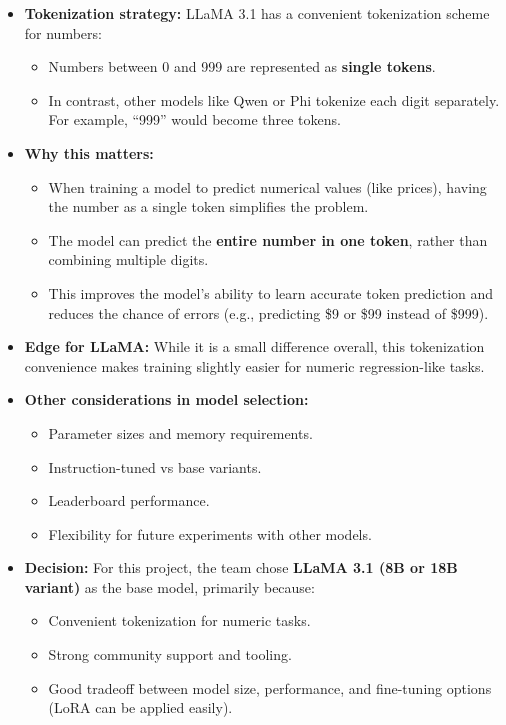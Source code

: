 \documentclass[a4paper, 12pt]{article}
\begin{document}
\begin{itemize}
    \item \textbf{Tokenization strategy:} LLaMA 3.1 has a convenient tokenization scheme for numbers:
    \begin{itemize}
        \item Numbers between 0 and 999 are represented as \textbf{single tokens}.
        \item In contrast, other models like Qwen or Phi tokenize each digit separately. For example, ``999'' would become three tokens.
    \end{itemize}

    \item \textbf{Why this matters:}
    \begin{itemize}
        \item When training a model to predict numerical values (like prices), having the number as a single token simplifies the problem.
        \item The model can predict the \textbf{entire number in one token}, rather than combining multiple digits.
        \item This improves the model's ability to learn accurate token prediction and reduces the chance of errors (e.g., predicting \$9 or \$99 instead of \$999).
    \end{itemize}

    \item \textbf{Edge for LLaMA:} While it is a small difference overall, this tokenization convenience makes training slightly easier for numeric regression-like tasks.
    
    \item \textbf{Other considerations in model selection:}
    \begin{itemize}
        \item Parameter sizes and memory requirements.
        \item Instruction-tuned vs base variants.
        \item Leaderboard performance.
        \item Flexibility for future experiments with other models.
    \end{itemize}
    
    \item \textbf{Decision:} For this project, the team chose \textbf{LLaMA 3.1 (8B or 18B variant)} as the base model, primarily because:
    \begin{itemize}
        \item Convenient tokenization for numeric tasks.
        \item Strong community support and tooling.
        \item Good tradeoff between model size, performance, and fine-tuning options (LoRA can be applied easily).
    \end{itemize}
\end{itemize}
\end{document}
